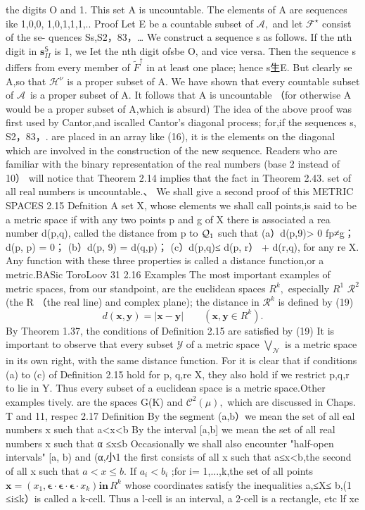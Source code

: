the digits O and 1. This set A is uncountable. The elements of A are sequences ike 1,0,0, 1,0,1,1,1,.. Proof Let E be a countable subset of ${\mathcal{A}},$ and let ${\mathcal{F}}^{\star}$ consist of the se- quences Ss,S2，83，… We construct a sequence s as follows. If the nth digit in $\mathbf{s}_{I I}^{\mathsf{S}}$ is 1, we Iet the nth digit ofsbe O, and vice versa. Then the sequence s differs from every member of ${\widetilde{F}}^{\dagger}$ in at least one place; hence s生E. But clearly se A,so that ${\mathcal{H}}^{\nu}$ is a proper subset of A. We have shown that every countable subset of ${\mathcal{A}}\,$ is a proper subset of A. It follows that A is uncountable （for otherwise A would be a proper subset of A,which is absurd) The idea of the above proof was first used by Cantor,and iscalled Cantor's diagonal process; for,if the sequences s, S2，83，. are placed in an array like (16), it is the elements on the diagonal which are involved in the construction of the new sequence. Readers who are familiar with the binary representation of the real numbers (base 2 instead of 10） will notice that Theorem 2.14 implies that the fact in Theorem 2.43. set of all real numbers is uncountable.、 We shall give a second proof of this METRIC SPACES 2.15 Defnition A set X, whose elements we shall call points,is said to be a metric space if with any two points p and g of X there is associated a rea number d(p,q), called the distance from p to ${\cal Q}_{1}$ such that (a）d(p,9)> 0 fp≠g；d(p, p) = 0； (b）d(p, 9) = d(q,p)； (c）d(p,q)≤ d(p, r） + d(r,q), for any re X. Any function with these three properties is called a distance function,or a metric.BASic ToroLoov 31 2.16 Examples The most important examples of metric spaces, from our standpoint, are the euclidean spaces $R^{k},$ especially $\textstyle{R^{1}}$ $\textstyle{\mathcal{R}}^{2}$ (the R （the real line) and complex plane); the distance in $\textstyle{\mathcal{R}}^{k}$ is defined by (19) $$ d(\mathbf{x},\mathbf{y})=|\mathbf{x}-\mathbf{y}|\qquad(\mathbf{x},\mathbf{y}\in R^{k}). $$ By Theorem 1.37, the conditions of Definition 2.15 are satisfied by (19) It is important to observe that every subset ${\mathcal{Y}}$ of a metric space $\bigvee_{\mathcal{N}}$ is a metric space in its own right, with the same distance function. For it is clear that if conditions (a) to (c) of Definition 2.15 hold for p, q,re X, they also hold if we restrict p,q,r to lie in Y. Thus every subset of a euclidean space is a metric space.Other examples tively. are the spaces G(K) and ${\mathcal{C}}^{2}(\mu),$ which are discussed in Chaps. T and 11, respec 2.17 Definition By the segment (a,b）we mean the set of all eal numbers x such that a<x<b By the interval [a,b] we mean the set of all real numbers x such that α ≤x≤b Occasionally we shall also encounter "half-open intervals" [a, b) and (α,小1 the first consists of all x such that a≤x<b,the second of all x such that $a<x\leq b.$ If $a_{i}<b_{i}$ ;for i= 1,...,k,the set of all points $\mathbf{x}=\left(x_{1},\mathbf{\epsilon}\cdot\mathbf{\epsilon}\cdot\mathbf{\epsilon}\cdot x_{k}\right)\mathbf{in}\,R^{k}$ whose coordinates satisfy the inequalities a,≤X≤ b,(1 ≤i≤k）is called a k-cell. Thus a l-cell is an interval, a 2-cell is a rectangle, etc lf xe 